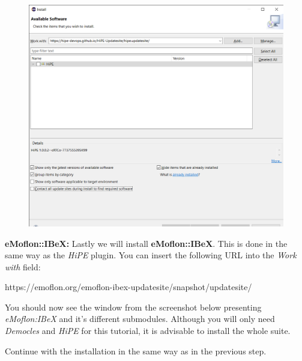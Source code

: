 \begin{figure}[h]
    \centering
    \includegraphics[scale=0.5]{pictures/eclipse_install_new_software_hipe.png}
    \caption{}
    \label{screenshot install new software hipe}
\end{figure}

\clearpage

\textbf{eMoflon::IBeX:}\newline\newline
Lastly we will install \textbf{eMoflon::IBeX}. This is done in the same way as the \textsf{\textit{HiPE}} plugin. You can insert the following URL into the \textsf{\textit{Work with}} field:\newline

\centering
{\color{blue}https://emoflon.org/emoflon-ibex-updatesite/snapshot/updatesite/\newline}


\raggedright
You should now see the window from the screenshot below presenting \textsf{\textit{eMoflon:IBeX}} and it's different submodules. Although you will only need \textsf{\textit{Democles}} and \textsf{\textit{HiPE}} for this tutorial, it is advisable to install the whole suite.

Continue with the installation in the same way as in the previous step.\newline

